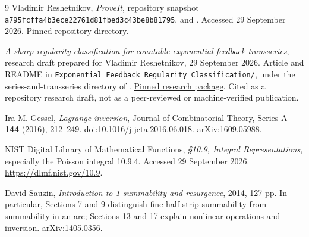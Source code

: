 \documentclass[11pt,a4paper]{article}
\numberwithin{equation}{section}
\theoremstyle{definition}
\theoremstyle{remark}
\begin{document}
\clearpage
\begin{thebibliography}{9}
Vladimir Reshetnikov, \emph{ProveIt}, repository snapshot\newline
\texttt{a795fcffa4b3ece22761d81fbed3c43be8b81795}.\newline
{} and\newline
{}.
Accessed 29 September 2026.
\href{https://github.com/VladimirReshetnikov/ProveIt/tree/a795fcffa4b3ece22761d81fbed3c43be8b81795/Analysis/Transseries}{Pinned repository directory}.

\emph{A sharp regularity classification for countable exponential-feedback
transseries}, research draft prepared for Vladimir Reshetnikov,
29 September 2026.  Article and README in
\texttt{Exponential\_Feedback\_Regularity\_Classification/},
under the series-and-transseries directory of \cite{project}.
\href{https://github.com/VladimirReshetnikov/ProveIt/tree/a795fcffa4b3ece22761d81fbed3c43be8b81795/Analysis/Transseries/docs/series-and-transseries/Exponential_Feedback_Regularity_Classification}{Pinned research package}.
Cited as a repository research draft, not as a peer-reviewed or
machine-verified publication.

Ira M. Gessel, \emph{Lagrange inversion}, Journal of Combinatorial Theory,
Series A \textbf{144} (2016), 212--249.
\href{https://doi.org/10.1016/j.jcta.2016.06.018}{doi:10.1016/j.jcta.2016.06.018}.
\href{https://arxiv.org/abs/1609.05988}{arXiv:1609.05988}.

NIST Digital Library of Mathematical Functions,
\emph{\S10.9, Integral Representations}, especially the Poisson integral
10.9.4.  Accessed 29 September 2026.
\url{https://dlmf.nist.gov/10.9}.

David Sauzin, \emph{Introduction to 1-summability and resurgence},
2014, 127 pp.  In particular, Sections 7 and 9 distinguish fine
half-strip summability from summability in an arc; Sections 13 and 17
explain nonlinear operations and inversion.
\href{https://arxiv.org/abs/1405.0356}{arXiv:1405.0356}.

\end{thebibliography}
\end{document}
